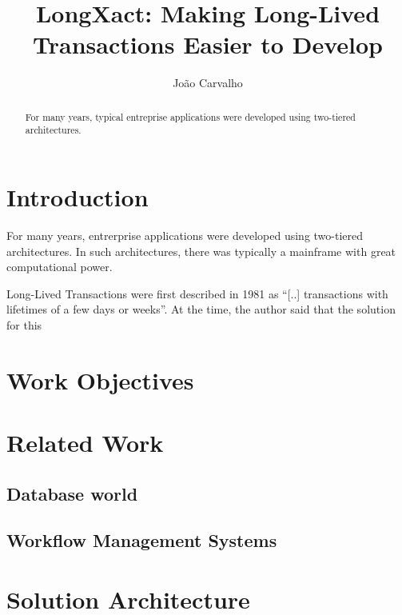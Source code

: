 \documentclass{llncs}
\begin{document}
\title{LongXact: Making Long-Lived Transactions Easier to Develop}

\author{João Carvalho}
\maketitle


\begin{abstract}
For many years, typical entreprise applications were developed using
two-tiered architectures. 
\end{abstract}


\section{Introduction}

For many years, entrerprise applications were developed using
two-tiered architectures. In such architectures, there was typically a
mainframe with great computational power.

Long-Lived Transactions were first described in
1981 as ``[..] transactions with lifetimes of a few days or
weeks''\cite{gray1981transaction}. At the time, the author said that the
solution for this 

\section{Work Objectives}

\section{Related Work}

\subsection{Database world}

\subsection{Workflow Management Systems}

\section{Solution Architecture}
\end{document}
